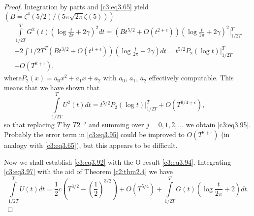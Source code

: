 \begin{proof}
Integration by parts and \eqref{c3:eq3.65} yield $(B = \zeta^4
(5/2)/(5 \pi \sqrt{2 \pi} \zeta (5)))$
\begin{multline*}
  \int\limits_{1/2 T}^T G^2 (t) \left(\log \frac{t}{2 \pi} + 2 \gamma
  \right)^2 dt = (Bt^{5/2} + O(t^{2 + \epsilon})) \left(\log
  \frac{t}{2\pi} + 2 \gamma \right)^2 \Bigg|_{1/2T}^T\\
  - 2 \int\limits{1/2 T}^T (Bt^{3/2} + O(t^{1+ \epsilon})) \left(\log
  \frac{t}{2\pi} + 2 \gamma \right)dt = t^{5/2} P_2 (\log
  t)\Bigg|_{1/2T}^T\\
  + O(T^{2+\epsilon}),
\end{multline*}
where\pageoriginale $P_2(x) = a_0 x^2 + a_1 x+ a_2$ with $a_0$, $a_1$,
$a_2$ effectively computable. This means that we have shown that
$$
\int\limits_{1/2 T}^T U^2 (t) dt = t^{5/2} P_2 (\log t) \Bigg|_{1/2 T}^T
 + O(T^{9/4 +\epsilon}),
$$
so that replacing $T$ by $T2^{-j}$ and summing over $j= 0, 1, 2,
\ldots$ we obtain \eqref{c3:eq3.95}. Probably the error term in
\eqref{c3:eq3.95} could be improved to $O(T^{2+\epsilon})$ (in analogy
with \eqref{c3:eq3.65}), but this appears to be difficult.

Now we shall establish \eqref{c3:eq3.92} with the O-result
\eqref{c3:eq3.94}. Integrating \eqref{c3:eq3.97} with the aid of
Theorem \ref{c2:thm2.4} we have
{\fontsize{10pt}{12pt}\selectfont
\begin{equation}
  \int\limits_{1/2 T}^T U(t) dt = \frac{1}{2} c \left(T^{3/2}- \left(\frac{1}{2}
  \right)^{3/2}\right) + O(T^{5/4})+ \int\limits_{1/2 T}^T G(t) \left(\log
  \frac{t}{2 \pi} + 2\right)dt.\label{c3:eq3.98}
 \end{equation}}


\end{proof}
